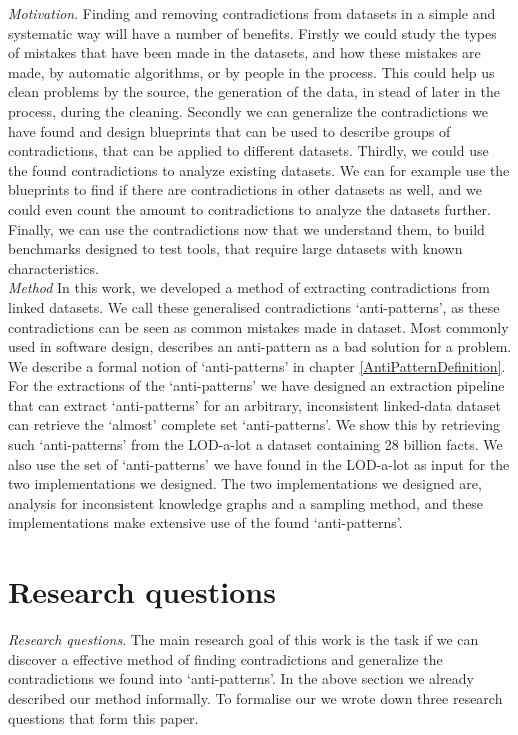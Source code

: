 \documentclass[11pt,letterpaper ,oneside ]{book}
\begin{document}
\textit{Motivation}. Finding and removing contradictions from datasets in a simple and systematic way will have a number of benefits. Firstly we could study the types of mistakes that have been made in the datasets, and how these mistakes are made, by automatic algorithms, or by people in the process. This could help us clean problems by the source, the generation of the data, in stead of later in the process, during the cleaning. 
Secondly we can generalize the contradictions we have found and design blueprints that can be used to describe groups of contradictions, that can be applied to different datasets. Thirdly, we could use the found contradictions to analyze existing datasets. We can for example use the blueprints to find if there are contradictions in other datasets as well, and we could even count the amount to contradictions to analyze the datasets further. 
Finally, we can use the contradictions now that we understand them, to build benchmarks designed to test tools, that require large datasets with known characteristics.\\

\textit{Method} In this work, we developed a method of extracting contradictions from linked datasets. We call these generalised contradictions `anti-patterns', as these contradictions can be seen as common mistakes made in dataset. Most commonly used in software design, describes an anti-pattern as a bad solution for a problem. We describe a formal notion of `anti-patterns' in chapter \ref{AntiPatternDefinition}.\\

For the extractions of the `anti-patterns' we have designed an extraction pipeline that can extract `anti-patterns' for an arbitrary, inconsistent linked-data dataset can retrieve the `almost' complete set `anti-patterns'. We show this by retrieving such `anti-patterns' from the LOD-a-lot\cite{JavierD:2017} a dataset containing 28 billion facts. We also use the set of `anti-patterns' we have found in the LOD-a-lot as input for the two implementations we designed. The two implementations we designed are, analysis for inconsistent knowledge graphs and a sampling method, and these implementations make extensive use of the found `anti-patterns'. 

\section{Research questions}
\textit{Research questions}. The main research goal of this work is the task if we can discover a effective method of finding contradictions and generalize the contradictions we found into `anti-patterns'. In the above section we already described our method informally. To formalise our we wrote down three research questions that form this paper.
\end{document}

